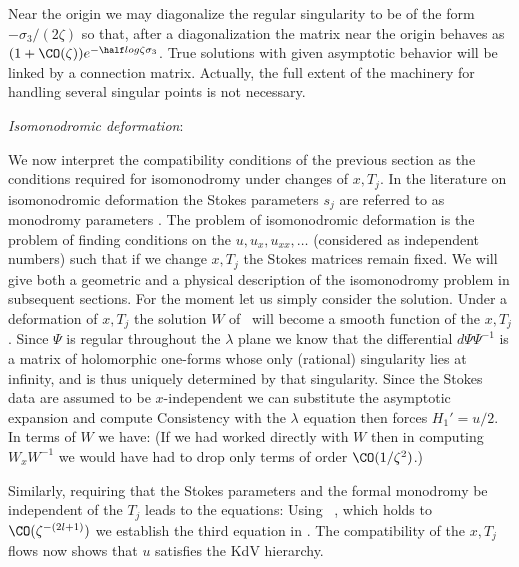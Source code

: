 Near the origin we may diagonalize the regular singularity to 
be of the form $-\sigma_3/(2\zeta)$ so that, after a diagonalization 
the matrix near the origin behaves as $(1+\CO(\zeta))e^{-\half log
\zeta\sigma_3}$. True solutions with given asymptotic behavior 
will be linked by a connection matrix.
Actually, the full extent of the machinery for handling 
several singular points is not necessary. 



\bigskip
{\it Isomonodromic deformation}:

We now interpret the compatibility conditions of the previous section 
as the conditions required for isomonodromy under changes of 
$x,T_j$. In the literature \Jimboi\Jimboii\Jimboiii\Its
on isomonodromic deformation the Stokes parameters $s_j$
are referred to as monodromy parameters
.
The problem of isomonodromic deformation is 
the problem of finding
conditions on the $u,u_x,u_{xx},\dots$ (considered as independent
numbers) such that if we change $x,T_j$ the 
Stokes matrices remain fixed. We will give both a geometric 
and a physical description of the isomonodromy problem in 
subsequent sections. For the moment let us simply consider
the solution. Under 
a deformation of $x,T_j$ the solution $W$ of \dforz\ will become a 
smooth function 
of the $x,T_j$. 
Since $\Psi$ is regular throughout the $\lambda$ 
plane we know that the differential $d\Psi \Psi^{-1}$ is a 
matrix of holomorphic one-forms whose only (rational) singularity 
lies at infinity, and is thus uniquely determined by that 
singularity. Since the Stokes data are assumed to be 
$x$-independent we can
substitute the asymptotic expansion and
compute
\eqn{}
Consistency with the $\lambda$ equation then forces $H_1'=u/2$. 
In terms of $W$ we have:
\eqn{} 
(If we had worked directly with 
$W$ then in computing $W_xW^{-1}$ we would have had to drop 
only terms of order $\CO(1/\zeta^2)$.)

Similarly, requiring that the Stokes parameters and 
the formal monodromy be independent of the 
$T_j$ leads to the equations:
\eqn{}
Using \what\ , which holds to $\CO(\zeta^{-(2l+1)})$
we establish the third equation in \linsys .
The compatibility of the $x,T_j$ flows now shows that $u$ 
satisfies the KdV hierarchy.

